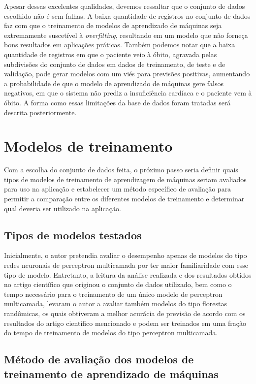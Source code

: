 Apesar dessas excelentes qualidades, devemos ressaltar que o conjunto de dados escolhido não é sem falhas. A baixa quantidade de registros no conjunto de dados faz com que o treinamento de modelos de aprendizado de máquinas seja extremamente suscetível à \textit{overfitting}, resultando em um modelo que não forneça bons resultados em aplicações práticas. Também podemos notar que a baixa quantidade de registros em que o paciente veio à óbito, agravada pelas subdivisões do conjunto de dados em dados de treinamento, de teste e de validação, pode gerar modelos com um viés para previsões positivas, aumentando a probabilidade de que o modelo de aprendizado de máquinas gere falsos negativos, em que o sistema não prediz a insuficiência cardíaca e o paciente vem à óbito. A forma como essas limitações da base de dados foram tratadas será descrita posteriormente.

\section{Modelos de treinamento}

Com a escolha do conjunto de dados feita, o próximo passo seria definir quais tipos de modelos de treinamento de aprendizagem de máquinas seriam avaliados para uso na aplicação e estabelecer um método específico de avaliação para permitir a comparação entre os diferentes modelos de treinamento e determinar qual deveria ser utilizado na aplicação.

\subsection{Tipos de modelos testados}

Inicialmente, o autor pretendia avaliar o desempenho apenas de modelos do tipo redes neuronais de perceptron multicamada por ter maior familiaridade com esse tipo de modelo. Entretanto, a leitura da análise realizada e dos resultados obtidos no artigo científico\cite{chicco2020} que originou o conjunto de dados utilizado\cite{larxel_dataset}, bem como o tempo necessário para o treinamento de um único modelo de perceptron multicamada, levaram o autor a avaliar também modelos do tipo florestas randômicas, os quais obtiveram a melhor acurácia de previsão de acordo com os resultados do artigo científico mencionado e podem ser treinados em uma fração do tempo de treinamento de modelos do tipo perceptron multicamada.

\subsection{Método de avaliação dos modelos de treinamento de aprendizado de máquinas}

